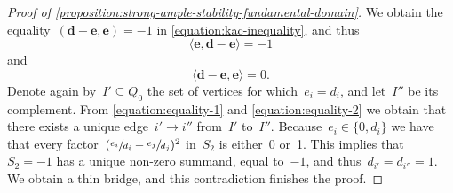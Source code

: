 \documentclass[JEP,XML,SOM,Unicode,NoEqCountersInSection,published]{cedram}
\theoremstyle{plain}
\theoremstyle{definition}
\newcommand\tuple[1]{\ensuremath{{\boldsymbol{#1}}}}
\begin{document}
\begin{proof}[Proof of \cref{proposition:strong-ample-stability-fundamental-domain}]
We obtain the equality~$(\tuple{d}-\tuple{e},\tuple{e})=-1$ in \eqref{equation:kac-inequality},
and thus\vspace*{-3pt}
\begin{equation}
\label{equation:equality-1}
\langle\tuple{e},\tuple{d}-\tuple{e}\rangle=-1
\end{equation}
and\vspace*{-3pt}
\begin{equation}
\label{equation:equality-2}
\langle\tuple{d}-\tuple{e},\tuple{e}\rangle=0.
\end{equation}
Denote again by~$I'\subseteq Q_0$ the set of vertices for which~$e_i=d_i$,
and let~$I''$ be its complement.
From \eqref{equation:equality-1} and \eqref{equation:equality-2}
we obtain that there exists a unique edge~$i'\to i''$ from~$I'$ to~$I''$.
Because~$e_i\in\{0,d_i\}$ we have that every factor~$(\sfrac{e_i}{d_i}-\sfrac{e_j}{d_j})^2$
in~$S_2$ is either~0 or~1.
This implies that~$S_2=-1$ has a unique non-zero summand,
equal to~$-1$,
and thus~$d_{i'}=d_{i''}=1$.
We obtain a thin bridge,
and this contradiction finishes the proof.
\end{proof}

\backmatter


\end{document}

